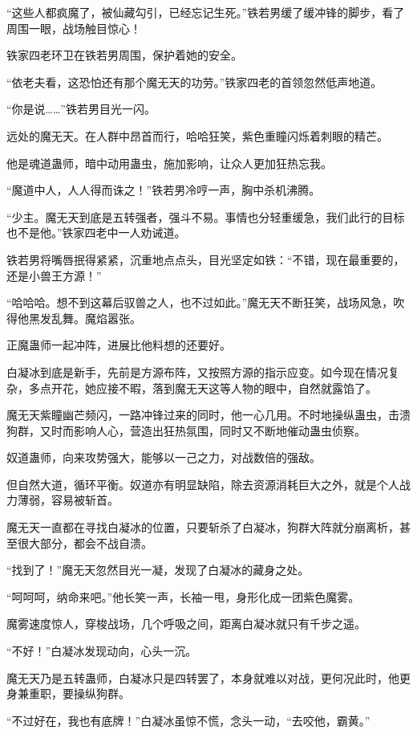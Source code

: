 \begin{this_body}
“这些人都疯魔了，被仙藏勾引，已经忘记生死。”铁若男缓了缓冲锋的脚步，看了周围一眼，战场触目惊心！

铁家四老环卫在铁若男周围，保护着她的安全。

“依老夫看，这恐怕还有那个魔无天的功劳。”铁家四老的首领忽然低声地道。

“你是说……”铁若男目光一闪。

远处的魔无天。在人群中昂首而行，哈哈狂笑，紫色重瞳闪烁着刺眼的精芒。

他是魂道蛊师，暗中动用蛊虫，施加影响，让众人更加狂热忘我。

“魔道中人，人人得而诛之！”铁若男冷哼一声，胸中杀机沸腾。

“少主。魔无天到底是五转强者，强斗不易。事情也分轻重缓急，我们此行的目标也不是他。”铁家四老中一人劝诫道。

铁若男将嘴唇抿得紧紧，沉重地点点头，目光坚定如铁：“不错，现在最重要的，还是小兽王方源！”

“哈哈哈。想不到这幕后驭兽之人，也不过如此。”魔无天不断狂笑，战场风急，吹得他黑发乱舞。魔焰嚣张。

正魔蛊师一起冲阵，进展比他料想的还要好。

白凝冰到底是新手，先前是方源布阵，又按照方源的指示应变。如今现在情况复杂，多点开花，她应接不暇，落到魔无天这等人物的眼中，自然就露馅了。

魔无天紫瞳幽芒频闪，一路冲锋过来的同时，他一心几用。不时地操纵蛊虫，击溃狗群，又时而影响人心，营造出狂热氛围，同时又不断地催动蛊虫侦察。

奴道蛊师，向来攻势强大，能够以一己之力，对战数倍的强敌。

但自然大道，循环平衡。奴道亦有明显缺陷，除去资源消耗巨大之外，就是个人战力薄弱，容易被斩首。

魔无天一直都在寻找白凝冰的位置，只要斩杀了白凝冰，狗群大阵就分崩离析，甚至很大部分，都会不战自溃。

“找到了！”魔无天忽然目光一凝，发现了白凝冰的藏身之处。

“呵呵呵，纳命来吧。”他长笑一声，长袖一甩，身形化成一团紫色魔雾。

魔雾速度惊人，穿梭战场，几个呼吸之间，距离白凝冰就只有千步之遥。

“不好！”白凝冰发现动向，心头一沉。

魔无天乃是五转蛊师，白凝冰只是四转罢了，本身就难以对战，更何况此时，他更身兼重职，要操纵狗群。

“不过好在，我也有底牌！”白凝冰虽惊不慌，念头一动，“去咬他，霸黄。”


\end{this_body}

